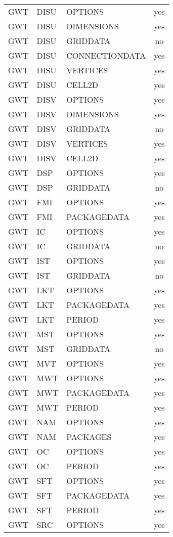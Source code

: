 \begin{longtable}{p{1.5cm} p{1.5cm} p{3cm} c}
\hline
GWT & DISU & OPTIONS & yes \\ 
GWT & DISU & DIMENSIONS & yes \\ 
GWT & DISU & GRIDDATA & no \\ 
GWT & DISU & CONNECTIONDATA & yes \\ 
GWT & DISU & VERTICES & yes \\ 
GWT & DISU & CELL2D & yes \\ 
\hline
GWT & DISV & OPTIONS & yes \\ 
GWT & DISV & DIMENSIONS & yes \\ 
GWT & DISV & GRIDDATA & no \\ 
GWT & DISV & VERTICES & yes \\ 
GWT & DISV & CELL2D & yes \\ 
\hline
GWT & DSP & OPTIONS & yes \\ 
GWT & DSP & GRIDDATA & no \\ 
\hline
GWT & FMI & OPTIONS & yes \\ 
GWT & FMI & PACKAGEDATA & yes \\ 
\hline
GWT & IC & OPTIONS & yes \\ 
GWT & IC & GRIDDATA & no \\ 
\hline
GWT & IST & OPTIONS & yes \\ 
GWT & IST & GRIDDATA & no \\ 
\hline
GWT & LKT & OPTIONS & yes \\ 
GWT & LKT & PACKAGEDATA & yes \\ 
GWT & LKT & PERIOD & yes \\ 
\hline
GWT & MST & OPTIONS & yes \\ 
GWT & MST & GRIDDATA & no \\ 
\hline
GWT & MVT & OPTIONS & yes \\ 
\hline
GWT & MWT & OPTIONS & yes \\ 
GWT & MWT & PACKAGEDATA & yes \\ 
GWT & MWT & PERIOD & yes \\ 
\hline
GWT & NAM & OPTIONS & yes \\ 
GWT & NAM & PACKAGES & yes \\ 
\hline
GWT & OC & OPTIONS & yes \\ 
GWT & OC & PERIOD & yes \\ 
\hline
GWT & SFT & OPTIONS & yes \\ 
GWT & SFT & PACKAGEDATA & yes \\ 
GWT & SFT & PERIOD & yes \\ 
\hline
GWT & SRC & OPTIONS & yes \\ 

\end{longtable}
